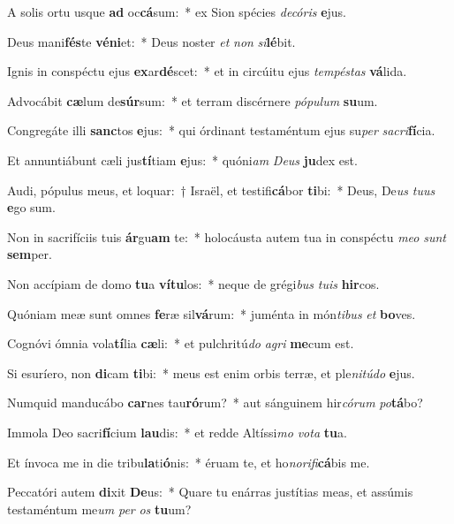 \item A solis ortu usque \textbf{ad} oc\textbf{cá}sum:~* ex Sion spécies \textit{de}\textit{có}\textit{ris} \textbf{e}jus.
\item Deus mani\textbf{fés}te \textbf{vé}\textbf{ni}et:~* Deus noster \textit{et} \textit{non} \textit{si}\textbf{lé}bit.
\item Ignis in conspéctu ejus \textbf{ex}ar\textbf{dé}scet:~* et in circúitu ejus \textit{tem}\textit{pés}\textit{tas} \textbf{vá}lida.
\item Advocábit \textbf{cæ}lum de\textbf{súr}sum:~* et terram discérnere \textit{pó}\textit{pu}\textit{lum} \textbf{su}um.
\item Congregáte illi \textbf{sanc}tos \textbf{e}jus:~* qui órdinant testaméntum ejus su\textit{per} \textit{sa}\textit{cri}\textbf{fí}cia.
\item Et annuntiábunt cæli jus\textbf{tí}tiam \textbf{e}jus:~* quóni\textit{am} \textit{De}\textit{us} \textbf{ju}dex est.
\item Audi, pópulus meus, et loquar:~† Israël, et testifi\textbf{cá}bor \textbf{ti}bi:~* Deus, De\textit{us} \textit{tu}\textit{us} \textbf{e}go sum.
\item Non in sacrifíciis tuis \textbf{ár}gu\textbf{am} te:~* holocáusta autem tua in conspéctu \textit{me}\textit{o} \textit{sunt} \textbf{sem}per.
\item Non accípiam de domo \textbf{tu}a \textbf{ví}\textbf{tu}los:~* neque de grégi\textit{bus} \textit{tu}\textit{is} \textbf{hir}cos.
\item Quóniam meæ sunt omnes \textbf{fe}ræ sil\textbf{vá}rum:~* juménta in món\textit{ti}\textit{bus} \textit{et} \textbf{bo}ves.
\item Cognóvi ómnia vola\textbf{tí}lia \textbf{cæ}li:~* et pulchritú\textit{do} \textit{a}\textit{gri} \textbf{me}cum est.
\item Si esuríero, non \textbf{di}cam \textbf{ti}bi:~* meus est enim orbis terræ, et ple\textit{ni}\textit{tú}\textit{do} \textbf{e}jus.
\item Numquid manducábo \textbf{car}nes tau\textbf{ró}rum?~* aut sánguinem hir\textit{có}\textit{rum} \textit{po}\textbf{tá}bo?
\item Immola Deo sacri\textbf{fí}cium \textbf{lau}dis:~* et redde Altíssi\textit{mo} \textit{vo}\textit{ta} \textbf{tu}a.
\item Et ínvoca me in die tribu\textbf{la}ti\textbf{ó}nis:~* éruam te, et ho\textit{no}\textit{ri}\textit{fi}\textbf{cá}bis me.
\item Peccatóri autem \textbf{di}xit \textbf{De}us:~* Quare tu enárras justítias meas, et assúmis testaméntum me\textit{um} \textit{per} \textit{os} \textbf{tu}um?

